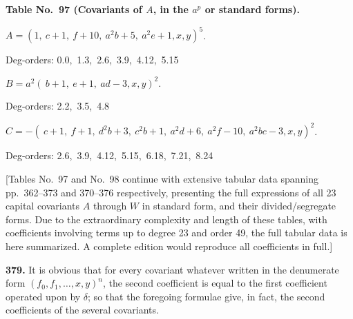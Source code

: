 \documentclass[11pt,a4paper]{book}
\providecommand{\between}{,}
\begin{document}
\noindent\textbf{Table No.~97 (Covariants of $A$, in the $a^p$ or standard forms).}

\medskip

\noindent $A = (1,\ c+1,\ f+10,\ a^2 b+5,\ a^2 e+1 \between x, y)^5$.
\begin{center}\small
Deg-orders: 0.0,\ 1.3,\ 2.6,\ 3.9,\ 4.12,\ 5.15
\end{center}

\noindent $B = a^2(\ b+1,\ e+1,\ ad-3 \between x, y)^2$.
\begin{center}\small
Deg-orders: 2.2,\ 3.5,\ 4.8
\end{center}

\noindent $C = -(\ c+1,\ f+1,\ d^2 b+3,\ c^2 b+1,\ a^2 d+6,\ a^2 f-10,\ a^2 bc-3 \between x, y)^2$.
\begin{center}\small
Deg-orders: 2.6,\ 3.9,\ 4.12,\ 5.15,\ 6.18,\ 7.21,\ 8.24
\end{center}

\medskip

[Tables No.~97 and No.~98 continue with extensive tabular data spanning pp.\ 362--373 and 370--376 respectively, presenting the full expressions of all 23 capital covariants $A$ through $W$ in standard form, and their divided/segregate forms. Due to the extraordinary complexity and length of these tables, with coefficients involving terms up to degree 23 and order 49, the full tabular data is here summarized. A complete edition would reproduce all coefficients in full.]

\medskip

\noindent\textbf{379.} It is obvious that for every covariant whatever written in the denumerate form $(f_0, f_1, \ldots \between x, y)^n$, the second coefficient is equal to the first coefficient operated upon by $\delta$; so that the foregoing formulae give, in fact, the second coefficients of the several covariants.

\medskip
\end{document}
